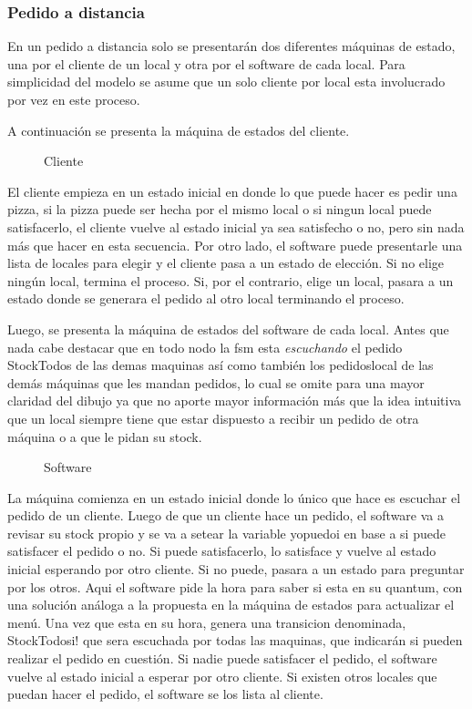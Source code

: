 \documentclass[a4paper,10pt]{article}
\begin{document}
\subsubsection*{Pedido a distancia}

En un pedido a distancia solo se presentar\'an dos diferentes m\'aquinas de estado, una por el cliente de un local y otra por el software de cada local. Para simplicidad del modelo se asume que un solo cliente por local esta involucrado por vez en este proceso.

A continuaci\'on se presenta la m\'aquina de estados del cliente.

\begin{figure}[H]
\centering
{}
\caption{Cliente}
\end{figure}

El cliente empieza en un estado inicial en donde lo que puede hacer es pedir una pizza, si la pizza puede ser hecha por el mismo local o si ningun local puede satisfacerlo, el cliente vuelve al estado inicial ya sea satisfecho o no, pero sin nada m\'as que hacer en esta secuencia. Por otro lado, el software puede presentarle una lista de locales para elegir y el cliente pasa a un estado de elecci\'on. Si no elige ning\'un local, termina el proceso. Si, por el contrario, elige un local, pasara a un estado donde se generara el pedido al otro local terminando el proceso.


Luego, se presenta la m\'aquina de estados del software de cada local.
Antes que nada cabe destacar que en todo nodo la fsm esta \emph{escuchando} el pedido StockTodos de las demas maquinas as\'i como tambi\'en los pedidoslocal de las dem\'as m\'aquinas que les mandan pedidos, lo cual se omite para una mayor claridad del dibujo ya que no aporte mayor informaci\'on m\'as que la idea intuitiva que un local siempre tiene que estar dispuesto a recibir un pedido de otra m\'aquina o a que le pidan su stock.

\begin{figure}[H]
\centering
{}
\caption{Software}
\end{figure}

La m\'aquina comienza en un estado inicial donde lo \'unico que hace es escuchar el pedido de un cliente. Luego de que un cliente hace un pedido, el software va a revisar su stock propio y se va a setear la variable yopuedoi en base a si puede satisfacer el pedido o no. Si puede satisfacerlo, lo satisface y vuelve al estado inicial esperando por otro cliente. Si no puede, pasara a un estado para preguntar por los otros. Aqui el software pide la hora para saber si esta en su quantum, con una soluci\'on an\'aloga a la propuesta en la m\'aquina de estados para actualizar el men\'u. Una vez que esta en su hora, genera una transicion denominada, StockTodosi! que sera escuchada por todas las maquinas, que indicar\'an si pueden realizar el pedido en cuesti\'on. Si nadie puede satisfacer el pedido, el software vuelve al estado inicial a esperar por otro cliente. Si existen otros locales que puedan hacer el pedido, el software se los lista al cliente.
\end{document}
